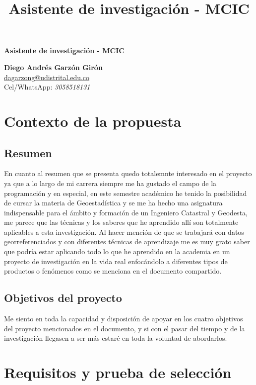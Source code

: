 \documentclass[12pt]{article}
\title{Asistente de investigación - MCIC}
\begin{document}
\begin{center}
{\Large\bfseries Asistente de investigación - MCIC} \\
\end{center}

\begin{center}
\textbf{Diego Andrés Garzón Girón} \\
\href{mailto:dagarzong@udistrital.edu.co}{dagarzong@udistrital.edu.co} \\
Cel/WhatsApp: \textit{3058518131}
\end{center}

\section{Contexto de la propuesta}
\subsection{Resumen}
En cuanto al resumen que se presenta quedo totalemnte interesado en el proyecto ya que a lo largo de mi carrera siempre me ha gustado el campo de la programación y en especial, en este semestre académico he tenido la posibilidad de cursar la materia de Geoestadística y se me ha hecho una asignatura indispensable para el ámbito y formación de un Ingeniero Catastral y Geodesta, me parece que las técnicas y los saberes que he aprendido allí son totalmente aplicables a esta investigación. Al hacer mención de que se trabajará con datos georreferenciados y con diferentes técnicas de aprendizaje me es muy grato saber que podría estar aplicando todo lo que he aprendido en la academia en un proyecto de investigación en la vida real enfocándolo a diferentes tipos de productos o fenómenos como se menciona en el documento compartido. 
\subsection{Objetivos del proyecto}
Me siento en toda la capacidad y disposición de apoyar en los cuatro objetivos del proyecto mencionados en el documento, y si con el pasar del tiempo y de la investigación llegasen a ser más estaré en toda la voluntad de abordarlos.

\section{Requisitos y prueba de selección}
\end{document}
